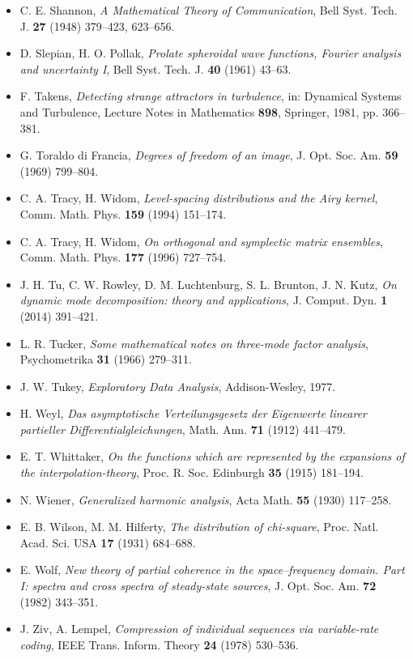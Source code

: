 \documentclass[10pt,letterpaper,twocolumn]{article}
\begin{document}
\begin{itemize}
\item
  C. E. Shannon, \emph{A Mathematical Theory of Communication}, Bell Syst. Tech. J. \textbf{27} (1948) 379--423, 623--656.
\item
  D. Slepian, H. O. Pollak, \emph{Prolate spheroidal wave functions, Fourier analysis and uncertainty I}, Bell Syst. Tech. J. \textbf{40} (1961) 43--63.
\item
  F. Takens, \emph{Detecting strange attractors in turbulence}, in: Dynamical Systems and Turbulence, Lecture Notes in Mathematics \textbf{898}, Springer, 1981, pp. 366--381.
\item
  G. Toraldo di Francia, \emph{Degrees of freedom of an image}, J. Opt. Soc. Am. \textbf{59} (1969) 799--804.
\item
  C. A. Tracy, H. Widom, \emph{Level-spacing distributions and the Airy kernel}, Comm. Math. Phys. \textbf{159} (1994) 151--174.
\item
  C. A. Tracy, H. Widom, \emph{On orthogonal and symplectic matrix ensembles}, Comm. Math. Phys. \textbf{177} (1996) 727--754.
\item
  J. H. Tu, C. W. Rowley, D. M. Luchtenburg, S. L. Brunton, J. N. Kutz, \emph{On dynamic mode decomposition: theory and applications}, J. Comput. Dyn. \textbf{1} (2014) 391--421.
\item
  L. R. Tucker, \emph{Some mathematical notes on three-mode factor analysis}, Psychometrika \textbf{31} (1966) 279--311.
\item
  J. W. Tukey, \emph{Exploratory Data Analysis}, Addison-Wesley, 1977.
\item
  H. Weyl, \emph{Das asymptotische Verteilungsgesetz der Eigenwerte linearer partieller Differentialgleichungen}, Math. Ann. \textbf{71} (1912) 441--479.
\item
  E. T. Whittaker, \emph{On the functions which are represented by the expansions of the interpolation-theory}, Proc. R. Soc. Edinburgh \textbf{35} (1915) 181--194.
\item
  N. Wiener, \emph{Generalized harmonic analysis}, Acta Math. \textbf{55} (1930) 117--258.
\item
  E. B. Wilson, M. M. Hilferty, \emph{The distribution of chi-square}, Proc. Natl. Acad. Sci. USA \textbf{17} (1931) 684--688.
\item
  E. Wolf, \emph{New theory of partial coherence in the space--frequency domain. Part I: spectra and cross spectra of steady-state sources}, J. Opt. Soc. Am. \textbf{72} (1982) 343--351.
\item
  J. Ziv, A. Lempel, \emph{Compression of individual sequences via variable-rate coding}, IEEE Trans. Inform. Theory \textbf{24} (1978) 530--536.
\end{itemize}
\end{document}
